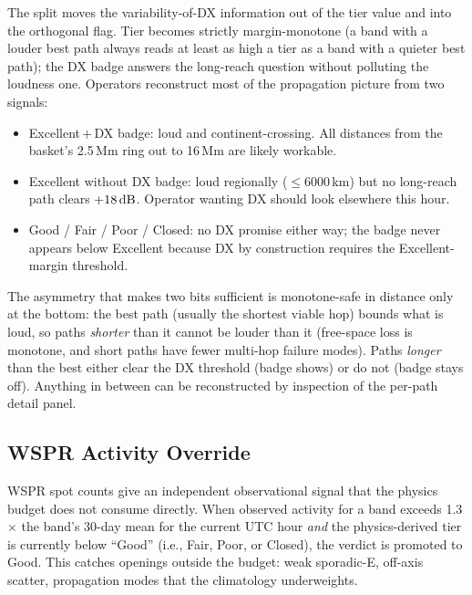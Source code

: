 \documentclass[11pt,a4paper]{article}
\newcommand{\si}[1]{\text{#1}}
\newcommand{\dB}{\text{dB}}
\begin{document}
The split moves the variability-of-DX information out of the
tier value and into the orthogonal flag.  Tier becomes
strictly margin-monotone (a band with a louder best path
always reads at least as high a tier as a band with a quieter
best path); the DX badge answers the long-reach question
without polluting the loudness one.  Operators reconstruct
most of the propagation picture from two signals:
\begin{itemize}[nosep]
  \item Excellent\,$+$\,DX badge: loud and continent-crossing.
        All distances from the basket's 2.5\,Mm ring out to
        16\,Mm are likely workable.
  \item Excellent without DX badge: loud regionally
        ($\leq\!6000\,$km) but no long-reach path clears
        $+18\,\si{\dB}$.  Operator wanting DX should look
        elsewhere this hour.
  \item Good / Fair / Poor / Closed: no DX promise either
        way; the badge never appears below Excellent because
        DX by construction requires the Excellent-margin
        threshold.
\end{itemize}
The asymmetry that makes two bits sufficient is monotone-safe
in distance only at the bottom: the best path (usually the
shortest viable hop) bounds what is loud, so paths
\emph{shorter} than it cannot be louder than it (free-space
loss is monotone, and short paths have fewer multi-hop
failure modes).  Paths \emph{longer} than the best either
clear the DX threshold (badge shows) or do not (badge stays
off).  Anything in between can be reconstructed by inspection
of the per-path detail panel.

\subsection{WSPR Activity Override}\label{sec:spot-override}

WSPR spot counts give an independent observational signal that the
physics budget does not consume directly.  When observed activity for
a band exceeds 1.3$\times$ the band's 30-day mean for the current
UTC hour \emph{and} the physics-derived tier is currently below
``Good'' (i.e., Fair, Poor, or Closed), the verdict is promoted to
Good.  This catches openings outside the budget: weak
sporadic-E, off-axis scatter, propagation modes that the
climatology underweights.
\end{document}
